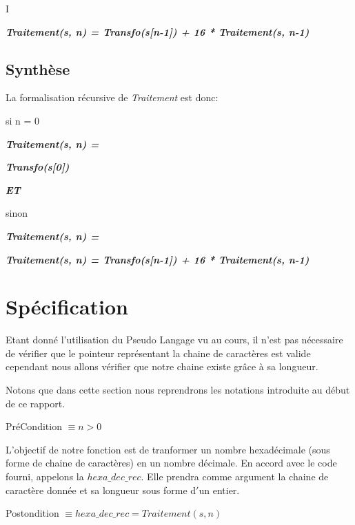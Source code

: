 \documentclass[a4paper, 11pt, oneside]{article}
\begin{document}
I

\begin{center}
\textit{\textbf{Traitement(s, n) = Transfo(s[n-1]) + 16 * Traitement(s, n-1)}}
\end{center}


\subsection{Synthèse}


La formalisation récursive de \textit{Traitement} est donc:

\begin{center}

{\large si n = 0}

\textit{\textbf{Traitement(s, n) =}} 

\textit{\textbf{Transfo(s[0])}} 

\textit{\textbf{{\large ET}}} 

{\large sinon}

\textit{\textbf{Traitement(s, n) =}} 

\textit{\textbf{Traitement(s, n) = Transfo(s[n-1]) + 16 * Traitement(s, n-1)}} 

\end{center}


\section{Spécification}\label{specification}


Etant donné l'utilisation du Pseudo Langage vu au cours, il n'est pas nécessaire 
de vérifier que le pointeur représentant la chaine de caractères est valide
cependant nous allons vérifier que notre chaine existe grâce à sa longueur.

Notons que dans cette section nous reprendrons les notations introduite au début 
de ce rapport.

\begin{center}
{\large PréCondition} $\equiv n > 0$
\end{center}

L'objectif de notre fonction est de tranformer un nombre hexadécimale (sous forme 
de chaine de caractères) en un nombre décimale. En accord avec le code fourni, 
appelons la $hexa\_dec\_rec$. Elle prendra comme argument la chaine de caractère
donnée et sa longueur sous forme d$'$un entier.

\begin{center}
{\large Postondition} $\equiv hexa\_dec\_rec = Traitement(s,n)$
\end{center}
\end{document}
